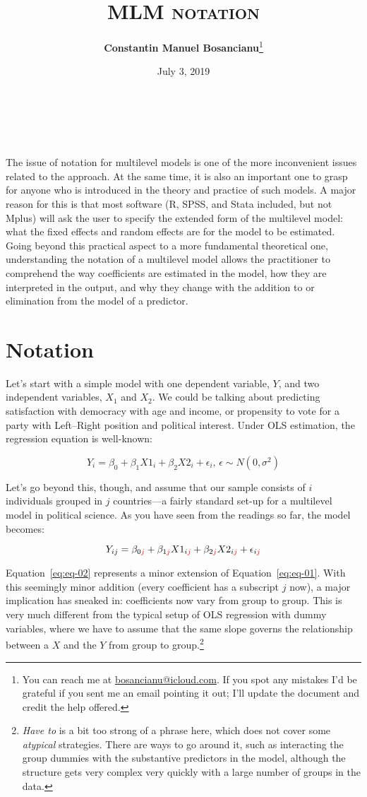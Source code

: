 \documentclass[12pt,english]{article}\usepackage[]{graphicx}\usepackage[usenames, dvipsnames]{xcolor}
\title{\textsc{MLM notation}}
\author{\textbf{Constantin Manuel Bosancianu}\footnote{You can reach me at \href{mailto:bosancianu@icloud.com}{bosancianu@icloud.com}. If you spot any mistakes I'd be grateful if you sent me an email pointing it out; I'll update the document and credit the help offered.}}
\affil{WZB Berlin Social Science Center \\ \textit{Institutions and Political Inequality}}
\date{July 3, 2019}
\makeatletter
\renewcommand{\maketitle}{
  \begin{flushleft}
    {\huge\@title}\\
    \vspace{10pt}
    {\large\@author}\\
    {\@date}
    \vspace{40pt}
  \end{flushleft}
}
\makeatother
\begin{document}
\maketitle

The issue of notation for multilevel models is one of the more inconvenient issues related to the approach. At the same time, it is also an important one to grasp for anyone who is introduced in the theory and practice of such models. A major reason for this is that most software (R, SPSS, and Stata included, but not Mplus) will ask the user to specify the extended form of the multilevel model: what the fixed effects and random effects are for the model to be estimated. Going beyond this practical aspect to a more fundamental theoretical one, understanding the notation of a multilevel model allows the practitioner to comprehend the way coefficients are estimated in the model, how they are interpreted in the output, and why they change with the addition to or elimination from the model of a predictor.

\section{Notation}

Let's start with a simple model with one dependent variable, $Y$, and two independent variables, $X_1$ and $X_2$. We could be talking about predicting satisfaction with democracy with age and income, or propensity to vote for a party with Left--Right position and political interest. Under OLS estimation, the regression equation is well-known:

\begin{equation}
Y_{i}=\beta_{0}+\beta_{1}X1_{i}+\beta_{2}X2_{i}+\epsilon_{i},\, \epsilon\sim N(0,\sigma^{2})
\label{eq:eq-01}
\end{equation}

Let's go beyond this, though, and assume that our sample consists of $i$ individuals grouped in $j$ countries---a fairly standard set-up for a multilevel model in political science. As you have seen from the readings so far, the model becomes:

\begin{equation}
Y_{ij}=\beta_{0\textcolor{red}{j}}+\beta_{1\textcolor{red}{j}}X1_{i\textcolor{red}{j}}+\beta_{2\textcolor{red}{j}}X2_{i\textcolor{red}{j}}+\epsilon_{i\textcolor{red}{j}}
\label{eq:eq-02}
\end{equation}

Equation~\ref{eq:eq-02} represents a minor extension of Equation~\ref{eq:eq-01}. With this seemingly minor addition (every coefficient has a subscript $j$ now), a major implication has sneaked in: coefficients now vary from group to group. This is very much different from the typical setup of OLS regression with dummy variables, where we have to assume that the same slope governs the relationship between a $X$ and the $Y$ from group to group.\footnote{\textit{Have to} is a bit too strong of a phrase here, which does not cover some \textit{atypical} strategies. There are ways to go around it, such as interacting the group dummies with the substantive predictors in the model, although the structure gets very complex very quickly with a large number of groups in the data.}
\end{document}

